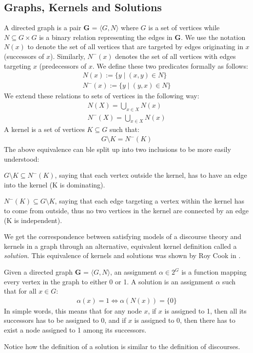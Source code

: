 \subsection{Graphs, Kernels and Solutions}
\label{sub:Graphs, Kernels and Solution}
A directed graph is a pair \textbf{G} = $\langle G,N \rangle$ where $G$ is a set of vertices while $N \subseteq G \times G$ is a binary relation representing the edges in \textbf{G}.
We use the notation $N(x)$ to denote the set of all vertices that are targeted by edges originating in $x$ (successors of $x$).
Similarly, $N^-(x)$ denotes the set of all vertices with edges targeting $x$ (predecessors of $x$.
We define these two predicates formally as follows:
\begin{align}
  N(x) := \{y \;|\; (x,y) \in N\}\\
  N^-(x) := \{ y \;|\; (y,x) \in N \}
\end{align}
We extend these relations to sets of vertices in the following way:
\begin{align}
  N(X) = \bigcup_{x \in X} N(x)\\
  N^-(X) = \bigcup_{x \in X} N(x)
\end{align}
A kernel is a set of vertices $K \subseteq G$ such that:
\begin{align}
  G \setminus K = N^-(K)
\end{align}
The above equivalence can ble split up into two inclusions to be more easily understood:

$G \setminus K \subseteq N^-(K)$, saying that each vertex outside the kernel, has to have an edge into the kernel (K is dominating).

$N^-(K) \subseteq G \setminus K$, saying that each edge targeting a vertex within the kernel has to come from outside, thus no two vertices in the kernel are connected by an edge (K is independent).

We get the correspondence between satisfying models of a discourse theory and kernels in a graph through an alternative, equivalent kernel definition called a \textit{solution}.
This equivalence of kernels and solutions was shown by Roy Cook in \cite{}.

Given a directed graph \textbf{G} = $\langle G,N \rangle$, an assignment $\alpha \in 2^G$ is a function mapping every vertex in the graph to either 0 or 1.
A solution is an assignment $\alpha$ such that for all $x \in G:$
\begin{align}
  \alpha(x) = 1 \iff \alpha(N(x)) = \{ 0 \}
\end{align}
In simple words, this means that for any node $x$, if $x$ is assigned to 1, then all its successors has to be assigned to 0, and if $x$ is assigned to 0, then there has to exist a node assigned to 1 among its successors.

Notice how the definition of a solution is similar to the definition of discourses.
